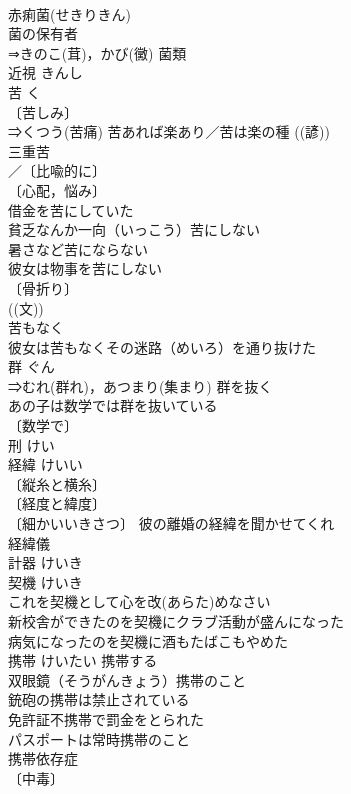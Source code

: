 \documentclass[8pt]{extreport}
\begin{document}
\begin{CJK}{UTF8}{min}
\\	赤痢菌(せきりきん) 
\\	菌の保有者 
\\	⇒きのこ(茸)，かび(黴) 菌類 
\\	近視	きんし	
\\	苦	く	
\\	〔苦しみ〕
\\	⇒くつう(苦痛) 苦あれば楽あり／苦は楽の種 ((諺)) 
\\	三重苦 
\\	／〔比喩的に〕
\\	〔心配，悩み〕
\\	借金を苦にしていた 
\\	貧乏なんか一向（いっこう）苦にしない 
\\	暑さなど苦にならない 
\\	彼女は物事を苦にしない 
\\	〔骨折り〕
\\	((文)) 
\\	苦もなく 
\\	彼女は苦もなくその迷路（めいろ）を通り抜けた 
\\	群	ぐん	
\\	⇒むれ(群れ)，あつまり(集まり) 群を抜く 
\\	あの子は数学では群を抜いている 
\\	〔数学で〕
\\	刑	けい	
\\	経緯	けいい	
\\	〔縦糸と横糸〕
\\	〔経度と緯度〕
\\	〔細かいいきさつ〕 彼の離婚の経緯を聞かせてくれ 
\\	経緯儀 
\\	計器	けいき	
\\	契機	けいき	
\\	これを契機として心を改(あらた)めなさい 
\\	新校舎ができたのを契機にクラブ活動が盛んになった 
\\	病気になったのを契機に酒もたばこもやめた 
\\	携帯	けいたい	携帯する 
\\	双眼鏡（そうがんきょう）携帯のこと 
\\	銃砲の携帯は禁止されている 
\\	免許証不携帯で罰金をとられた 
\\	パスポートは常時携帯のこと 
\\	携帯依存症 
\\	〔中毒〕 

\end{CJK}
\end{document}
